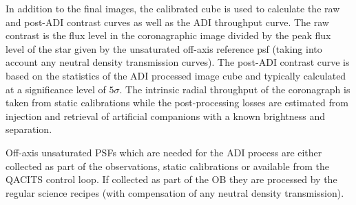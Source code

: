 In addition to the final images, the calibrated cube is used to calculate the raw and post-ADI contrast curves as
well as the ADI throughput curve. The raw contrast is the flux level in the coronagraphic image divided by the peak flux level of the star given by the unsaturated off-axis reference psf (taking into account any neutral density transmission curves). The post-ADI contrast curve is based on the statistics of the ADI processed image cube and typically calculated at a significance level of $5\sigma$. The intrinsic radial throughput of
the coronagraph is taken from static calibrations while the
post-processing losses are estimated from injection and retrieval of
artificial companions with a known brightness and separation.

Off-axis unsaturated PSFs which are needed for the ADI process are
either collected as part of the observations, static calibrations or
available from the QACITS control loop.  If collected as part of the
OB they are processed by the regular science recipes (with
compensation of any neutral density transmission). 


